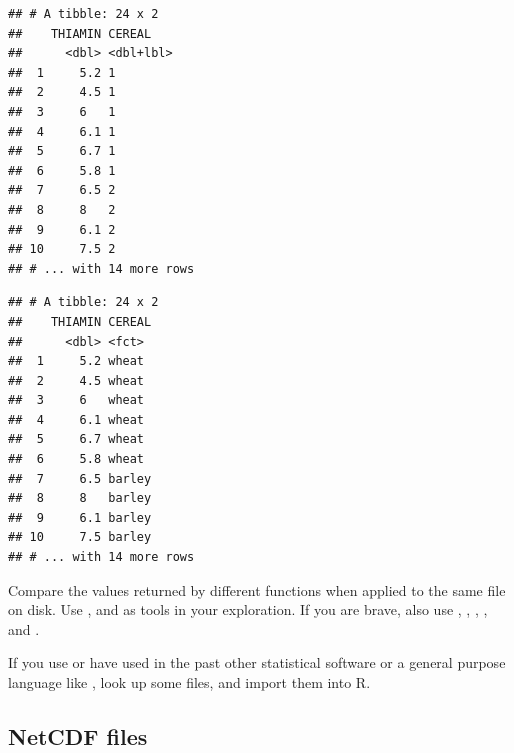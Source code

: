 \documentclass[krantz2]{krantz}\usepackage{knitr}%
\begin{document}
\begin{knitrout}\footnotesize
{}\color{fgcolor}\begin{kframe}
\begin{alltt}
 \hlkwb{<-} \hlstd{(} \hlstd{=} \hlstd{)}
\end{alltt}
\begin{verbatim}
## # A tibble: 24 x 2
##    THIAMIN CEREAL   
##      <dbl> <dbl+lbl>
##  1     5.2 1        
##  2     4.5 1        
##  3     6   1        
##  4     6.1 1        
##  5     6.7 1        
##  6     5.8 1        
##  7     6.5 2        
##  8     8   2        
##  9     6.1 2        
## 10     7.5 2        
## # ... with 14 more rows
\end{verbatim}
\begin{alltt}
 \hlkwb{<-} 
\end{alltt}
\begin{verbatim}
## # A tibble: 24 x 2
##    THIAMIN CEREAL
##      <dbl> <fct> 
##  1     5.2 wheat 
##  2     4.5 wheat 
##  3     6   wheat 
##  4     6.1 wheat 
##  5     6.7 wheat 
##  6     5.8 wheat 
##  7     6.5 barley
##  8     8   barley
##  9     6.1 barley
## 10     7.5 barley
## # ... with 14 more rows
\end{verbatim}
\end{kframe}
\end{knitrout}

\begin{playground}
Compare the values returned by different  functions when applied to the same file on disk. Use ,  and  as tools in your exploration. If you are brave, also use , , , ,  and .
\end{playground}

\begin{playground}
If you use or have used in the past other statistical software or a general purpose language like , look up some files, and import them into R.
\end{playground}

\subsection{NetCDF files}
\end{document}
